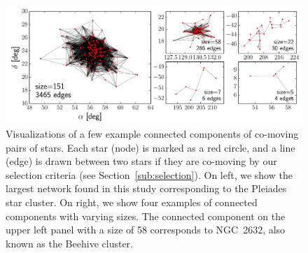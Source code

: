 \documentclass[manuscript, letterpaper]{aastex6}
\newcommand{\sectionname}{Section}
\begin{document}
\begin{figure}[htbp]
  \begin{center}
    \includegraphics[width=\textwidth]{figures/graphviz_examples.pdf}
  \end{center}
  \caption{%
    Visualizations of a few example connected components of co-moving pairs of stars.
    Each star (node) is marked as a red circle, and a line (edge) is drawn
    between two stars if they are co-moving by our selection criteria
    (see \sectionname~\ref{sub:selection}). On left, we show the largest network
    found in this study corresponding to the Pleiades star cluster.
    On right, we show four examples of connected components with varying sizes.
    The connected component on the upper left panel with a size of 58 corresponds
    to NGC~2632, also known as the Beehive cluster.
    \label{fig:graphviz_examples}}
\end{figure}
\end{document}
